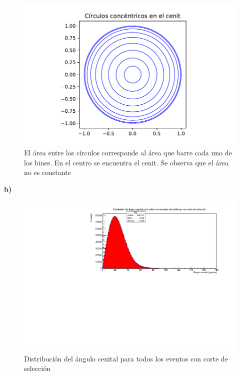 \documentclass[11pt]{article}
\begin{document}
\begin{figure}[H]
\centering
\includegraphics[width=1\textwidth]{../Figuras/Prob4Circ}
\caption{El área entre los círculos corresponde al área que barre cada uno de los bines. En el centro se encuentra el cenit. Se observa que el área no es constante}
\label{fig:Circulo}
\end{figure}
\textbf{b)}
\begin{figure}[H]
\centering
\includegraphics[width=1\textwidth]{../Figuras/Prob4B}
\caption{Distribución del ángulo cenital para todos los eventos con corte de selección}
\label{fig:Prob4B}
\end{figure}
\pagebreak
\end{document}
